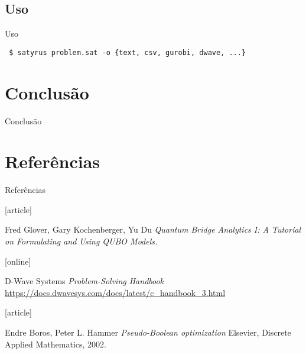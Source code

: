 \documentclass[brazil, MathSerif, aspectratio = 169]{beamer}
\begin{document}
\subsection{Uso}
\begin{frame}%
    {Uso}

    \texttt{%
        \$ satyrus problem.sat -o \{text, csv, gurobi, dwave, ...\}%
    }

\end{frame}

\section{Conclusão}
\begin{frame}{Conclusão}

\end{frame}

\section*{Referências}
\begin{frame}%
    {Referências}

    \begin{thebibliography}{}

        [article]

        Fred Glover, Gary Kochenberger, Yu Du
        \newblock \emph{Quantum Bridge Analytics I: A Tutorial on Formulating and Using QUBO Models.}




        [online]

        D-Wave Systems
        \newblock \emph{Problem-Solving Handbook}
        \newblock \url{https://docs.dwavesys.com/docs/latest/c_handbook_3.html}

        [article]

        Endre Boros, Peter L. Hammer
        \newblock \emph{Pseudo-Boolean optimization}
        \newblock Elsevier, Discrete Applied Mathematics, 2002.
    \end{thebibliography}
\end{frame}
\end{document}
